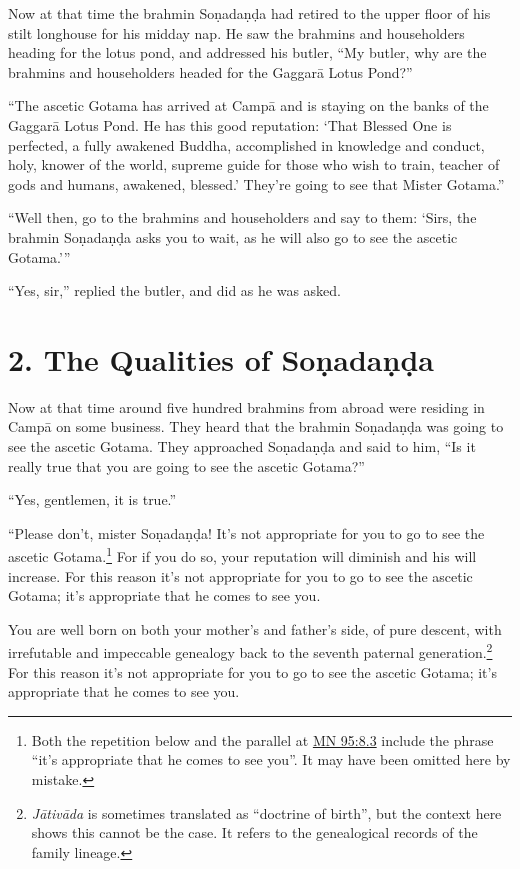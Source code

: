 \documentclass[12pt,openany]{book}%
\begin{document}
Now at that time the brahmin \textsanskrit{Soṇadaṇḍa} had retired to the upper floor of his stilt longhouse for his midday nap. He saw the brahmins and householders heading for the lotus pond, and addressed his butler, “My butler, why are the brahmins and householders headed for the \textsanskrit{Gaggarā} Lotus Pond?” 

“The ascetic Gotama has arrived at \textsanskrit{Campā} and is staying on the banks of the \textsanskrit{Gaggarā} Lotus Pond. He has this good reputation: ‘That Blessed One is perfected, a fully awakened Buddha, accomplished in knowledge and conduct, holy, knower of the world, supreme guide for those who wish to train, teacher of gods and humans, awakened, blessed.’ They’re going to see that Mister Gotama.” 

“Well then, go to the brahmins and householders and say to them: ‘Sirs, the brahmin \textsanskrit{Soṇadaṇḍa} asks you to wait, as he will also go to see the ascetic Gotama.’” 

“Yes, sir,” replied the butler, and did as he was asked. 

\section*{2. The Qualities of \textsanskrit{Soṇadaṇḍa} }

Now at that time around five hundred brahmins from abroad were residing in \textsanskrit{Campā} on some business. They heard that the brahmin \textsanskrit{Soṇadaṇḍa} was going to see the ascetic Gotama. They approached \textsanskrit{Soṇadaṇḍa} and said to him, “Is it really true that you are going to see the ascetic Gotama?” 

“Yes, gentlemen, it is true.” 

“Please don’t, mister \textsanskrit{Soṇadaṇḍa}! It’s not appropriate for you to go to see the ascetic Gotama.\footnote{Both the repetition below and the parallel at \href{https://suttacentral.net/mn95/en/sujato\#8.3}{MN 95:8.3} include the phrase “it’s appropriate that he comes to see you”. It may have been omitted here by mistake. } For if you do so, your reputation will diminish and his will increase. For this reason it’s not appropriate for you to go to see the ascetic Gotama; it’s appropriate that he comes to see you. 

You are well born on both your mother’s and father’s side, of pure descent, with irrefutable and impeccable genealogy back to the seventh paternal generation.\footnote{\textit{\textsanskrit{Jātivāda}} is sometimes translated as “doctrine of birth”, but the context here shows this cannot be the case. It refers to the genealogical records of the family lineage. } For this reason it’s not appropriate for you to go to see the ascetic Gotama; it’s appropriate that he comes to see you. 
\end{document}
